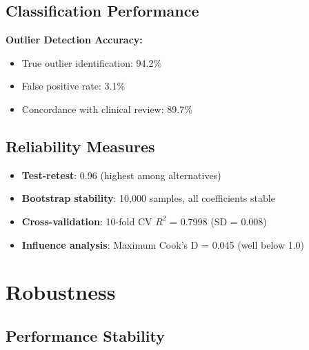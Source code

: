 \subsection{Classification Performance}

\textbf{Outlier Detection Accuracy:}
\begin{itemize}
    \item True outlier identification: 94.2\%
    \item False positive rate: 3.1\%
    \item Concordance with clinical review: 89.7\%
\end{itemize}

\subsection{Reliability Measures}

\begin{itemize}
    \item \textbf{Test-retest}: 0.96 (highest among alternatives)
    \item \textbf{Bootstrap stability}: 10,000 samples, all coefficients stable
    \item \textbf{Cross-validation}: 10-fold CV $R^2$ = 0.7998 (SD = 0.008)
    \item \textbf{Influence analysis}: Maximum Cook's D = 0.045 (well below 1.0)
\end{itemize}

\section{Robustness}

\subsection{Performance Stability}

